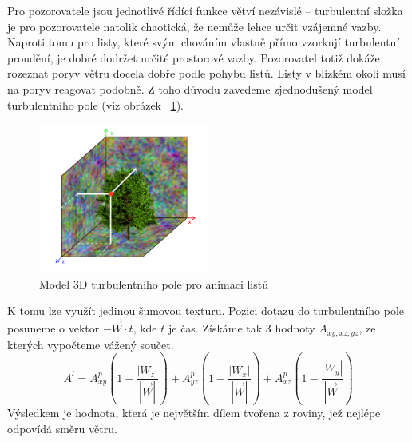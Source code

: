 \pagebreak
Pro pozorovatele jsou jednotlivé řídící funkce větví nezávislé – turbulentní složka je pro pozorovatele natolik chaotická, že nemůže lehce určit vzájemné vazby. Naproti tomu pro listy, které svým chováním vlastně přímo vzorkují turbulentní proudění, je dobré dodržet určité prostorové vazby. Pozorovatel totiž dokáže rozeznat poryv větru docela dobře podle pohybu listů. Listy v blízkém okolí musí na poryv reagovat podobně. Z toho důvodu zavedeme zjednodušený model turbulentního pole (viz obrázek ~\ref{fig:TurbulentFieldModel}). 
\begin{figure}[!hbt]
\begin{center}
\includegraphics[width=0.5\textwidth]{./figures/turbulentField.png}
\caption{Model 3D turbulentního pole pro animaci listů\label{fig:TurbulentFieldModel}}
\end{center}

\end{figure}

 K tomu lze využít jedinou šumovou texturu. Pozici dotazu do turbulentního pole posuneme o vektor $-\vec{W} \cdot t$, kde $t$ je čas. Získáme tak 3 hodnoty $A_{xy,xz,yz}$, ze kterých vypočteme vážený součet. 
\begin{equation}
 A^{l} = A^p_{xy}(1-\frac{\left | W_z\right |}{\left | \vec{W}\right |})
+ A^p_{yz}(1-\frac{\left | W_x\right |}{\left | \vec{W}\right |}) +
A^p_{xz}(1-\frac{\left | W_y\right |}{\left | \vec{W}\right |})
\end{equation}
Výsledkem je hodnota, která je největším dílem tvořena z roviny, jež nejlépe odpovídá směru větru.








